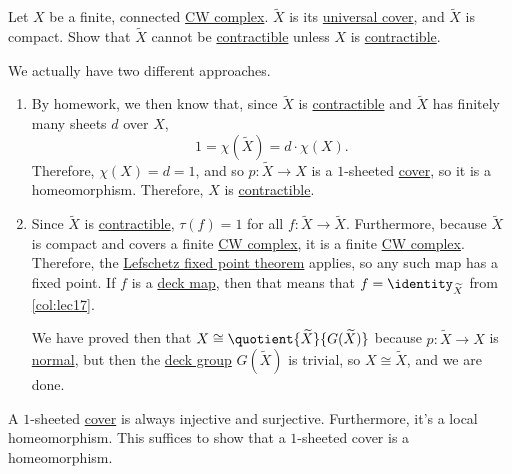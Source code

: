 \begin{eg}[QR May 2016]
	Let \(X\) be a finite, connected \hyperref[def:CW-Complex]{CW complex}. \(\widetilde{X}\) is its \hyperref[def:universal-covering]{universal cover},
	and \(\widetilde{X}\) is compact. Show that \(\widetilde{X}\) cannot be \hyperref[def:contractible]{contractible} unless \(X\) is \hyperref[def:contractible]{contractible}.
\end{eg}
\begin{explanation}
	We actually have two different approaches.
	\begin{enumerate}
		\item By homework, we then know that, since \(\widetilde{X}\) is \hyperref[def:contractible]{contractible} and \(\widetilde{X}\)
		      has finitely many sheets \(d\) over \(X\),
		      \[
			      1 = \chi(\widetilde{X}) = d \cdot \chi(X).
		      \]
		      Therefore, \(\chi(X) = d = 1\), and so \(p \colon \widetilde{X} \to X\) is a \(1\)-sheeted \hyperref[def:covering-map]{cover}, so
		      it is a homeomorphism. Therefore, \(X\) is \hyperref[def:contractible]{contractible}.
		\item Since \(\widetilde{X}\) is \hyperref[def:contractible]{contractible}, \(\tau(f) = 1\) for all \(f \colon \widetilde{X} \to \widetilde{X}\).
		      Furthermore, because \(\widetilde{X}\) is compact and covers a finite \hyperref[def:CW-Complex]{CW complex}, it is a finite \hyperref[def:CW-Complex]{CW complex}.
		      Therefore, the \hyperref[thm:Lefschetz-fixed-point]{Lefschetz fixed point theorem} applies, so any such map has a fixed point. If \(f\) is a
		      \hyperref[def:deck-transformation]{deck map}, then that means that \(f = \identity_{\widetilde{X}}\) from \autoref{col:lec17}.

		      We have proved then that \(X \cong \quotient{\widetilde{X}}{G(\widetilde{X})}\) because \(p \colon \widetilde{X} \to X\) is \hyperref[def:normal-cover]{normal},
		      but then the \hyperref[def:deck-transformation]{deck group} \(G(\widetilde{X})\) is trivial, so \(X \cong \widetilde{X}\), and we are done.
	\end{enumerate}
\end{explanation}
\begin{exercise}
	A \(1\)-sheeted \hyperref[def:covering-map]{cover} is always injective and surjective. Furthermore, it's a local homeomorphism.
	This suffices to show that a \(1\)-sheeted cover is a homeomorphism.
\end{exercise}

